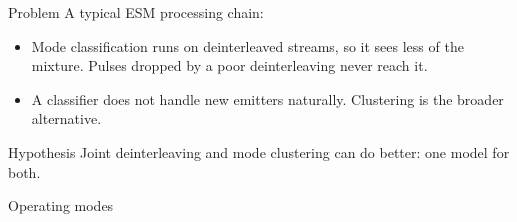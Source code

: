 \documentclass[aspectratio=169,10pt]{beamer}
\newcommand{\thesisfig}[3]{%
  \resizebox{#1}{#2}{}%
}
\begin{document}
\begin{frame}{Problem}
  A typical ESM processing chain:

  \vspace{0.5em}
  \centering
  \thesisfig{0.92\textwidth}{!}{../figures/background/classical_pipeline.tex}

  \vspace{0.7em}
  \raggedright
  \begin{itemize}
    \item Mode classification runs on deinterleaved streams, so it sees less of the mixture. Pulses dropped by a poor deinterleaving never reach it.
    \item A classifier does not handle new emitters naturally. Clustering is the broader alternative.
  \end{itemize}

  \vspace{0.4em}
  \begin{block}{Hypothesis}
    Joint deinterleaving and mode clustering can do better: one model for both.
  \end{block}
\end{frame}

\begin{frame}{Operating modes}
  \centering
  \thesisfig{0.96\textwidth}{!}{../figures/background/mode_patterns.tex}
\end{frame}
\end{document}
